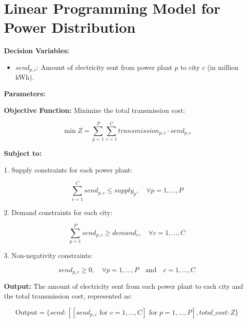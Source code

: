 \documentclass{article}
\begin{document}
\section*{Linear Programming Model for Power Distribution}

\textbf{Decision Variables:}
\begin{itemize}
    \item \( send_{p,c} \): Amount of electricity sent from power plant \( p \) to city \( c \) (in million kWh).
\end{itemize}

\textbf{Parameters:}

\textbf{Objective Function:}
Minimize the total transmission cost:

\[
\min Z = \sum_{p=1}^{P} \sum_{c=1}^{C} transmission_{p,c} \cdot send_{p,c}
\]

\textbf{Subject to:}

1. Supply constraints for each power plant:

\[
\sum_{c=1}^{C} send_{p,c} \leq supply_{p}, \quad \forall p = 1, \ldots, P
\]

2. Demand constraints for each city:

\[
\sum_{p=1}^{P} send_{p,c} \geq demand_{c}, \quad \forall c = 1, \ldots, C
\]

3. Non-negativity constraints:

\[
send_{p,c} \geq 0, \quad \forall p = 1, \ldots, P \quad \text{and} \quad c = 1, \ldots, C
\]

\textbf{Output:}
The amount of electricity sent from each power plant to each city and the total transmission cost, represented as:

\[
\text{Output} = \{ send: [[send_{p,c} \text{ for } c = 1, \ldots, C] \text{ for } p = 1, \ldots, P], total\_cost: Z \} 
\]
\end{document}
